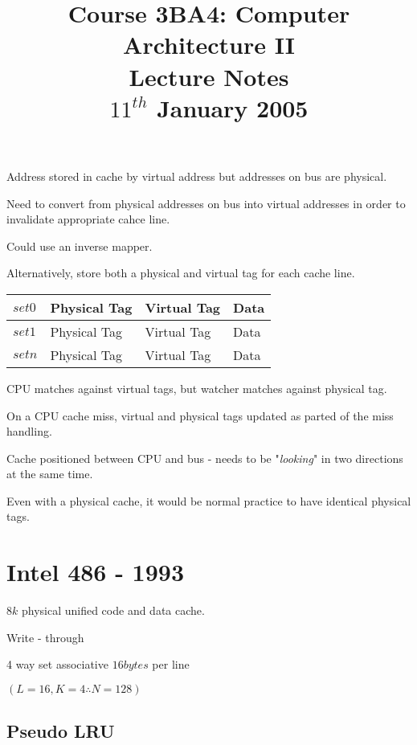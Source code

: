 \documentclass[a4paper,12pt]{article}
\begin{document}
\title{Course 3BA4: Computer Architecture II \\ Lecture Notes \\	$11^{th}$ January 2005}

\maketitle

Address stored in cache by virtual address but addresses on bus are
physical.

Need to convert from physical addresses on bus into virtual addresses in
order to invalidate appropriate cahce line.

Could use an inverse mapper.

Alternatively, store both a physical and virtual tag for each cache
line.

\begin{tabular}{l|l|l|l|}
\hline
$set 0$	&	Physical Tag	&	Virtual Tag	&	Data		\\
\hline
$set 1$	&	Physical Tag	&	Virtual Tag	&	Data		\\
\hline
$set n$	&	Physical Tag	&	Virtual Tag	&	Data		\\
\hline
\end{tabular}

CPU matches against virtual tags, but watcher matches against physical
tag.

On a CPU cache miss, virtual and physical tags updated as parted of the
miss handling.

Cache positioned between CPU and bus - needs to be "\emph{looking}" in
two directions at the same time.

Even with a physical cache, it would be normal practice to have
identical physical tags.

\section*{Intel 486 - 1993}

$8k$ physical unified code and data cache.

Write - through

4 way set associative $16 bytes$ per line

$(L = 16, K = 4 \therefore N = 128)$

\subsection*{Pseudo LRU}
\end{document}
